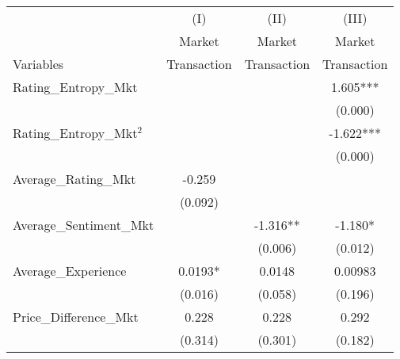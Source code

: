 \begin{table}
\centering
\begin{threeparttable}
\begin{tabular}{@{}lccc@{}}
\toprule
                                               & (I)            & (II)           & (III)          \\
                                               & Market    & Market    & Market    \\
Variables                                      & Transaction & Transaction & Transaction \\ \midrule
Rating\_Entropy\_Mkt                         &                       &                       & 1.605***              \\
                                             &                       &                       & (0.000)               \\
Rating\_Entropy\_Mkt$^2$ &                       &                       & -1.622***             \\
                                             &                       &                       & (0.000)               \\
Average\_Rating\_Mkt                         & -0.259                &                       &                       \\
                                             & (0.092)               &                       &                       \\
Average\_Sentiment\_Mkt                      &                       & -1.316**              & -1.180*               \\
                                             &                       & (0.006)               & (0.012)               \\
Average\_Experience                          & 0.0193*               & 0.0148                & 0.00983               \\
                                             & (0.016)               & (0.058)               & (0.196)               \\
Price\_Difference\_Mkt                       & 0.228                 & 0.228                 & 0.292                 \\
                                             & (0.314)               & (0.301)               & (0.182)               \\

\end{tabular}
\end{threeparttable}
\end{table}
